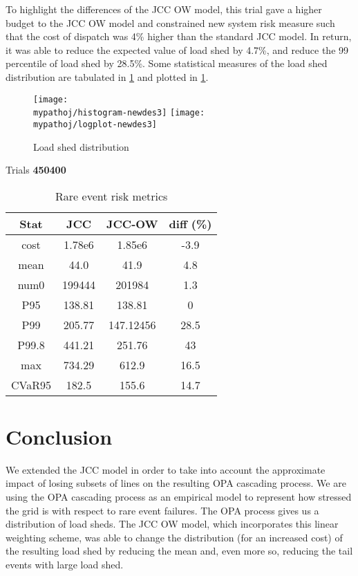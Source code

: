 To highlight the differences of the JCC OW model, this trial gave a higher budget to the JCC OW model and constrained new system risk measure such that the cost of dispatch was 4\% higher than the standard JCC model.  In return, it was able to reduce the expected value of load shed by 4.7\%, and reduce the 99 percentile of load shed by 28.5\%.  Some statistical measures of the load shed distribution are tabulated in \cref{rare_event_risk_metrics} and plotted in \cref{load_shed_dist_ow}.

\begin{figure}
\centering
\texttt{[image: \\mypathoj/histogram-newdes3]}
\texttt{[image: \\mypathoj/logplot-newdes3]}
\caption{Load shed distribution}
\label{load_shed_dist_ow}
\end{figure}


\begin{table}
\centering
Trials \textbf{450400}

\begin{tabular}{|c |  c c | c|}
\hline
Stat & JCC & JCC-OW & diff (\%) \\
\hline
cost&1.78e6 & 1.85e6 & \alert{-3.9} \\
mean&44.0&41.9 & 4.8   \\
num0&199444 & 201984 & 1.3 \\
P95& 138.81& 138.81  &  0         \\
P99& 205.77& 147.12456 &  28.5        \\
P99.8& 441.21& 251.76   &  43      \\
max& 734.29& 612.9      &  16.5            \\
CVaR95 & 182.5 & 155.6 & 14.7 \\
\hline
\end{tabular}
\caption{Rare event risk metrics}\label{rare_event_risk_metrics}
\end{table}


\section{Conclusion}
We extended the JCC model in order to take into account the approximate impact of losing subsets of lines on the resulting OPA cascading process.  We are using the OPA cascading process as an empirical model to represent how stressed the grid is with respect to rare event failures.  The OPA process gives us a distribution of load sheds.  The JCC OW model, which incorporates this linear weighting scheme, was able to change the distribution (for an increased cost) of the resulting load shed by reducing the mean and, even more so, reducing the tail events with large load shed.
